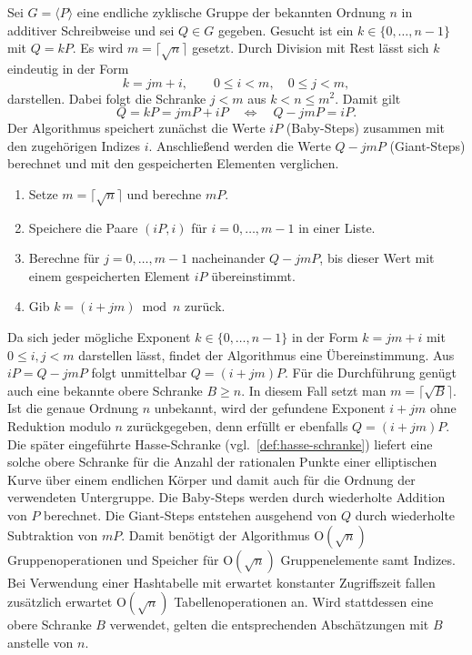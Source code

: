 Sei $G=\langle P\rangle$ eine endliche zyklische Gruppe der bekannten Ordnung $n$ in additiver Schreibweise und sei $Q\in G$ gegeben. Gesucht ist ein $k\in\{0,\dots,n-1\}$ mit $Q=kP$. Es wird $m=\lceil\sqrt{n}\rceil$ gesetzt. Durch Division mit Rest lässt sich $k$ eindeutig in der Form
\[
    k=jm+i,
    \qquad 0\leq i<m,\quad 0\leq j<m,
\]
darstellen. Dabei folgt die Schranke $j<m$ aus $k<n\leq m^2$. Damit gilt
\[
    Q=kP=jmP+iP
    \quad\Longleftrightarrow\quad
    Q-jmP=iP.
\]
Der Algorithmus speichert zunächst die Werte $iP$ (Baby-Steps) zusammen mit den zugehörigen Indizes $i$. Anschließend werden die Werte $Q-jmP$ (Giant-Steps) berechnet und mit den gespeicherten Elementen verglichen.
\begin{enumerate}
    \item Setze $m=\lceil\sqrt{n}\rceil$ und berechne $mP$.
    \item Speichere die Paare $(iP,i)$ für
          $i=0,\dots,m-1$ in einer Liste.
    \item Berechne für $j=0,\dots,m-1$ nacheinander
          $Q-jmP$, bis dieser Wert mit einem gespeicherten
          Element $iP$ übereinstimmt.
    \item Gib $k=(i+jm)\bmod n$ zurück.
\end{enumerate}
Da sich jeder mögliche Exponent $k\in\{0,\dots,n-1\}$ in der Form $k=jm+i$ mit $0\leq i,j<m$ darstellen lässt, findet der Algorithmus eine Übereinstimmung. Aus $iP=Q-jmP$ folgt unmittelbar $Q=(i+jm)P$. Für die Durchführung genügt auch eine bekannte obere Schranke $B\geq n$. In diesem Fall setzt man $m=\lceil\sqrt{B}\rceil$. Ist die genaue Ordnung $n$ unbekannt, wird der gefundene Exponent $i+jm$ ohne Reduktion modulo $n$ zurückgegeben, denn erfüllt er ebenfalls $Q=(i+jm)P$. Die später eingeführte Hasse-Schranke (vgl.~\ref{def:hasse-schranke}) liefert eine solche obere Schranke für die Anzahl der rationalen Punkte einer elliptischen Kurve über einem endlichen Körper und damit auch für die Ordnung der verwendeten Untergruppe. Die Baby-Steps werden durch wiederholte Addition von $P$ berechnet. Die Giant-Steps entstehen ausgehend von $Q$ durch wiederholte Subtraktion von $mP$. Damit benötigt der Algorithmus $\mathrm{O}(\sqrt{n})$ Gruppenoperationen und Speicher für $\mathrm{O}(\sqrt{n})$ Gruppenelemente samt Indizes. Bei Verwendung einer Hashtabelle mit erwartet konstanter Zugriffszeit fallen zusätzlich erwartet $\mathrm{O}(\sqrt{n})$ Tabellenoperationen an. Wird stattdessen eine obere Schranke $B$ verwendet, gelten die entsprechenden Abschätzungen mit $B$ anstelle von $n$.

